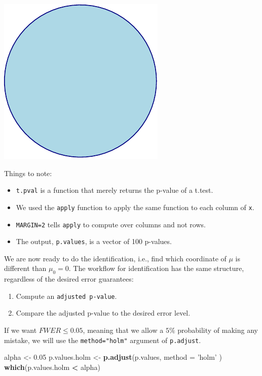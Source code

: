 \documentclass[]{book}
\newenvironment{Shaded}{\begin{snugshade}}{\end{snugshade}}
\newcommand{\DataTypeTok}[1]{\textcolor[rgb]{0.13,0.29,0.53}{#1}}
\newcommand{\FloatTok}[1]{\textcolor[rgb]{0.00,0.00,0.81}{#1}}
\newcommand{\KeywordTok}[1]{\textcolor[rgb]{0.13,0.29,0.53}{\textbf{#1}}}
\newcommand{\NormalTok}[1]{#1}
\newcommand{\OperatorTok}[1]{\textcolor[rgb]{0.81,0.36,0.00}{\textbf{#1}}}
\newcommand{\StringTok}[1]{\textcolor[rgb]{0.31,0.60,0.02}{#1}}
\providecommand{\tightlist}{%
  \setlength{\itemsep}{0pt}\setlength{\parskip}{0pt}}
\theoremstyle{definition}
\theoremstyle{definition}
\theoremstyle{definition}
\theoremstyle{remark}
\begin{document}
\includegraphics[width=0.5\linewidth]{Rcourse_files/figure-latex/unnamed-chunk-218-1}

Things to note:

\begin{itemize}
\tightlist
\item
  \texttt{t.pval} is a function that merely returns the p-value of a t.test.
\item
  We used the \texttt{apply} function to apply the same function to each column of \texttt{x}.
\item
  \texttt{MARGIN=2} tells \texttt{apply} to compute over columns and not rows.
\item
  The output, \texttt{p.values}, is a vector of 100 p-values.
\end{itemize}

We are now ready to do the identification, i.e., find which coordinate of \(\mu\) is different than \(\mu_0=0\).
The workflow for identification has the same structure, regardless of the desired error guarantees:

\begin{enumerate}
\def\labelenumi{\arabic{enumi}.}
\tightlist
\item
  Compute an \texttt{adjusted\ p-value}.
\item
  Compare the adjusted p-value to the desired error level.
\end{enumerate}

If we want \(FWER \leq 0.05\), meaning that we allow a \(5\%\) probability of making any mistake, we will use the \texttt{method="holm"} argument of \texttt{p.adjust}.

\begin{Shaded}
\begin{Highlighting}[]
\NormalTok{alpha <-}\StringTok{ }\FloatTok{0.05}
\NormalTok{p.values.holm <-}\StringTok{ }\KeywordTok{p.adjust}\NormalTok{(p.values, }\DataTypeTok{method =} \StringTok{'holm'}\NormalTok{ )}
\KeywordTok{which}\NormalTok{(p.values.holm }\OperatorTok{<}\StringTok{ }\NormalTok{alpha)}
\end{Highlighting}
\end{Shaded}
\end{document}
